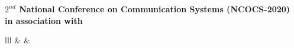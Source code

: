 \documentclass[12pt]{article}
\begin{document}
{		\vspace{-0.1cm}
		
		\begin{center}
			\textbf{\LARGE \color{red} $2^{nd}$ National Conference on Communication Systems (NCOCS-2020)}\\ 
			\vspace{0.25cm}
			{\large \textbf{in association with}}
		\end{center}
	
		\vspace{-0.8cm}
	
		\begin{table}[h!]
			\centering
			\large
			\begin{tabular}{lll}
				&  &                                                                                                                                                                                                                       \\
				\multicolum
\end{tabular}
\end{table}}
\end{document}

